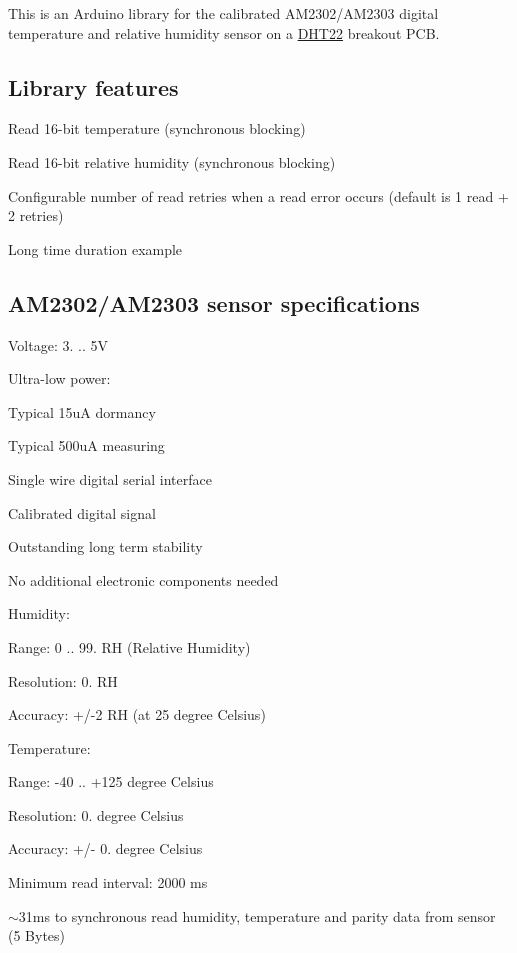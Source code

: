 \href{https://travis-ci.org/Erriez/ErriezDHT22}{\tt }

This is an Arduino library for the calibrated A\+M2302/\+A\+M2303 digital temperature and relative humidity sensor on a \hyperlink{class_d_h_t22}{D\+H\+T22} breakout P\+CB.



\subsection*{Library features}


\begin{DoxyItemize}
\item Read 16-\/bit temperature (synchronous blocking)
\item Read 16-\/bit relative humidity (synchronous blocking)
\item Configurable number of read retries when a read error occurs (default is 1 read + 2 retries)
\item Long time duration example
\end{DoxyItemize}

\subsection*{A\+M2302/\+A\+M2303 sensor specifications}


\begin{DoxyItemize}
\item Voltage\+: 3. .. 5V
\item Ultra-\/low power\+:
\begin{DoxyItemize}
\item Typical 15uA dormancy
\item Typical 500uA measuring
\end{DoxyItemize}
\item Single wire digital serial interface
\item Calibrated digital signal
\item Outstanding long term stability
\item No additional electronic components needed
\item Humidity\+:
\begin{DoxyItemize}
\item Range\+: 0 .. 99. RH (Relative Humidity)
\item Resolution\+: 0. RH
\item Accuracy\+: +/-\/2 RH (at 25 degree Celsius)
\end{DoxyItemize}
\item Temperature\+:
\begin{DoxyItemize}
\item Range\+: -\/40 .. +125 degree Celsius
\item Resolution\+: 0. degree Celsius
\item Accuracy\+: +/-\/ 0. degree Celsius
\end{DoxyItemize}
\item Minimum read interval\+: 2000 ms
\item $\sim$31ms to synchronous read humidity, temperature and parity data from sensor (5 Bytes)
\end{DoxyItemize}


